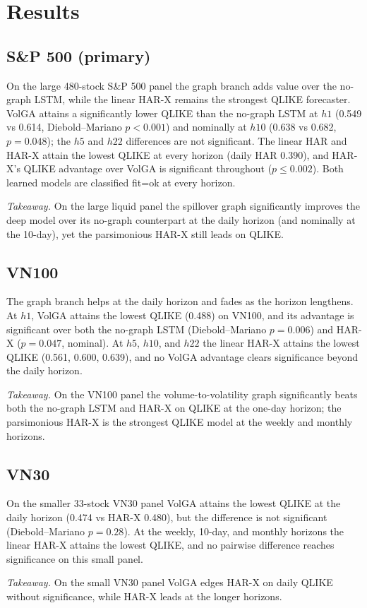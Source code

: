 \documentclass{llncs}
\begin{document}
\section{Results}\label{sec:results}

\subsection{S\&P 500 (primary)}
On the large 480-stock S\&P 500 panel the graph branch adds value over the no-graph LSTM, while the linear
HAR-X remains the strongest QLIKE forecaster. VolGA attains a significantly lower QLIKE than the no-graph LSTM
at $h1$ (0.549 vs 0.614, Diebold--Mariano $p<0.001$) and nominally at $h10$ (0.638 vs 0.682, $p=0.048$); the
$h5$ and $h22$ differences are not significant. The linear HAR and HAR-X attain the lowest QLIKE at every
horizon (daily HAR 0.390), and HAR-X's QLIKE advantage over VolGA is significant throughout ($p\le0.002$). Both
learned models are classified fit=ok at every horizon.

\textit{Takeaway.} On the large liquid panel the spillover graph significantly improves the deep model over its
no-graph counterpart at the daily horizon (and nominally at the 10-day), yet the parsimonious HAR-X still leads
on QLIKE.

\subsection{VN100}
The graph branch helps at the daily horizon and fades as the horizon lengthens. At $h1$, VolGA attains the
lowest QLIKE (0.488) on VN100, and its advantage is significant over both the no-graph LSTM (Diebold--Mariano
$p=0.006$) and HAR-X ($p=0.047$, nominal). At $h5$, $h10$, and $h22$ the linear HAR-X attains the lowest QLIKE
(0.561, 0.600, 0.639), and no VolGA advantage clears significance beyond the daily horizon.

\textit{Takeaway.} On the VN100 panel the volume-to-volatility graph significantly beats both the no-graph LSTM
and HAR-X on QLIKE at the one-day horizon; the parsimonious HAR-X is the strongest QLIKE model at the weekly and
monthly horizons.

\subsection{VN30}
On the smaller 33-stock VN30 panel VolGA attains the lowest QLIKE at the daily horizon (0.474 vs HAR-X 0.480),
but the difference is not significant (Diebold--Mariano $p=0.28$). At the weekly, 10-day, and monthly horizons
the linear HAR-X attains the lowest QLIKE, and no pairwise difference reaches significance on this small panel.

\textit{Takeaway.} On the small VN30 panel VolGA edges HAR-X on daily QLIKE without significance, while HAR-X
leads at the longer horizons.
\end{document}
